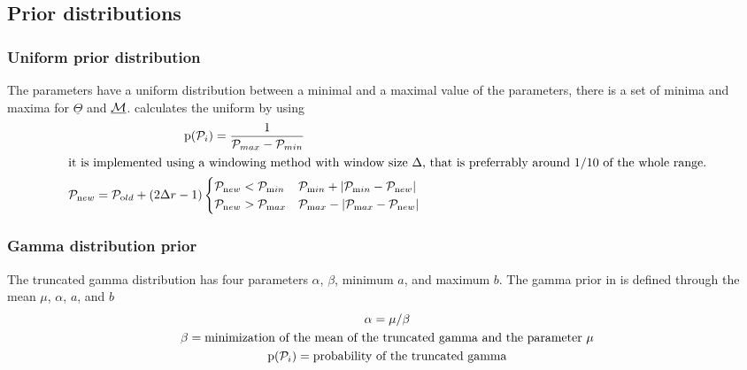 
\subsection{Prior distributions}
\vskip -0.5cm
\subsubsection{Uniform prior distribution}
The parameters have a uniform distribution between a minimal and a maximal value of the parameters, there is a set of minima and maxima for $\underline{\Theta}$ and $\underline{\mathcal{M}}$.
\migrate calculates the uniform by using
\begin{gather}
\label{UNIPRIOR}
    {\mathrm p}(\mathcal{P}_i) =  \frac{1}{\mathcal{P}_{max} - \mathcal{P}_{min}} \\
    \intertext{it is implemented using a windowing method with window size $\Delta$, that is preferrably around 1/10 of the whole range.}
    \mathcal{P}_{\mathrm new} =  \mathcal{P}_{\mathrm old} + (2 \Delta r - 1) \begin{cases} \mathcal{P}_{\mathrm new} < \mathcal{P}_{\mathrm min}  &  \mathcal{P}_{\mathrm min} + |\mathcal{P}_{\mathrm min} - \mathcal{P}_{\mathrm new}| \\
     \mathcal{P}_{\mathrm new} > \mathcal{P}_{\mathrm max}  &  \mathcal{P}_{\mathrm max} - |\mathcal{P}_{\mathrm max} - \mathcal{P}_{\mathrm new}| \end{cases}
\end{gather}

\subsubsection{Gamma distribution prior}
The truncated gamma distribution has four parameters $\alpha$, $\beta$, minimum $a$, and maximum $b$. The gamma prior in \migrate is defined through the mean $\mu$, $\alpha$, $a$, and $b$ 
\begin{gather}
\label{GAMMAPRIOR}
%
\alpha = \mu / \beta\\
\beta = \text{minimization of the mean of the truncated gamma and the parameter $\mu$}  \\
\prob(\P_i) =  \text{probability of the truncated gamma} 
\end{gather}



